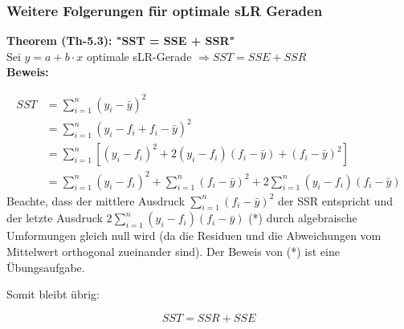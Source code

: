 \documentclass[12pt]{article}
\begin{document}
\subsubsection{Weitere Folgerungen für optimale sLR Geraden}  


\textbf{Theorem (Th-5.3): "SST = SSE + SSR"} \\[0.2cm]
Sei $ y = a + b \cdot x $ optimale sLR-Gerade $ \Longrightarrow SST = SSE + SSR $
\\[0.2cm]
\textbf{Beweis:} 

\begin{align*}
SST &= \sum_{i=1}^{n} (y_i - \bar{y})^2 \\
&= \sum_{i=1}^{n} (y_i - f_i + f_i - \bar{y})^2 \\
&= \sum_{i=1}^{n} [(y_i - f_i)^2 + 2(y_i - f_i)(f_i - \bar{y}) + (f_i - \bar{y})^2] \\
&= \sum_{i=1}^{n} (y_i - f_i)^2 + \sum_{i=1}^{n} (f_i - \bar{y})^2 + 2\sum_{i=1}^{n} (y_i - f_i)(f_i - \bar{y})
\end{align*}
%
Beachte, dass der mittlere Ausdruck $\sum_{i=1}^{n} (f_i - \bar{y})^2$ der SSR entspricht und der letzte Ausdruck $2\sum_{i=1}^{n} (y_i - f_i)(f_i - \bar{y})$ (*) durch algebraische Umformungen gleich null wird (da die Residuen und die Abweichungen vom Mittelwert orthogonal zueinander sind).
Der Beweis von (*) ist eine Übungsaufgabe.
 
Somit bleibt übrig:

\[
SST = SSR + SSE
\]
\end{document}
